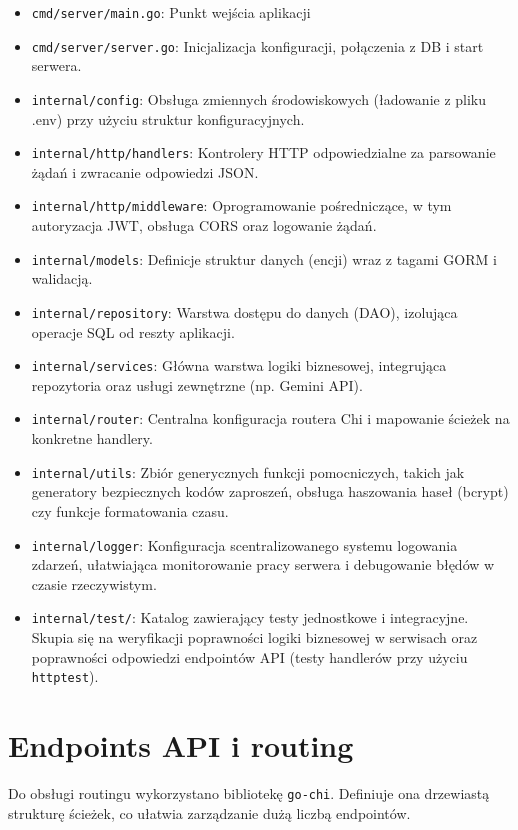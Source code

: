 \begin{itemize}
\item \texttt{cmd/server/main.go}: Punkt wejścia aplikacji
\item \texttt{cmd/server/server.go}: Inicjalizacja konfiguracji, połączenia z DB i start serwera.
\item \texttt{internal/config}: Obsługa zmiennych środowiskowych (ładowanie z pliku .env) przy użyciu struktur konfiguracyjnych.
\item \texttt{internal/http/handlers}: Kontrolery HTTP odpowiedzialne za parsowanie żądań i zwracanie odpowiedzi JSON.
\item \texttt{internal/http/middleware}: Oprogramowanie pośredniczące, w tym autoryzacja JWT, obsługa CORS oraz logowanie żądań.
\item \texttt{internal/models}: Definicje struktur danych (encji) wraz z tagami GORM i walidacją.
\item \texttt{internal/repository}: Warstwa dostępu do danych (DAO), izolująca operacje SQL od reszty aplikacji.
\item \texttt{internal/services}: Główna warstwa logiki biznesowej, integrująca repozytoria oraz usługi zewnętrzne (np. Gemini API).
\item \texttt{internal/router}: Centralna konfiguracja routera Chi i mapowanie ścieżek na konkretne handlery.
\item \texttt{internal/utils}: Zbiór generycznych funkcji pomocniczych, takich jak generatory bezpiecznych kodów zaproszeń, obsługa haszowania haseł (bcrypt) czy funkcje formatowania czasu.
\item \texttt{internal/logger}: Konfiguracja scentralizowanego systemu logowania zdarzeń, ułatwiająca monitorowanie pracy serwera i debugowanie błędów w czasie rzeczywistym.
\item \texttt{internal/test/}: Katalog zawierający testy jednostkowe i integracyjne. Skupia się na weryfikacji poprawności logiki biznesowej w serwisach oraz poprawności odpowiedzi endpointów API (testy handlerów przy użyciu \texttt{httptest}).
\end{itemize}

\section{Endpoints API i routing}

Do obsługi routingu wykorzystano bibliotekę \texttt{go-chi}. Definiuje ona drzewiastą strukturę ścieżek, co ułatwia zarządzanie dużą liczbą endpointów.

